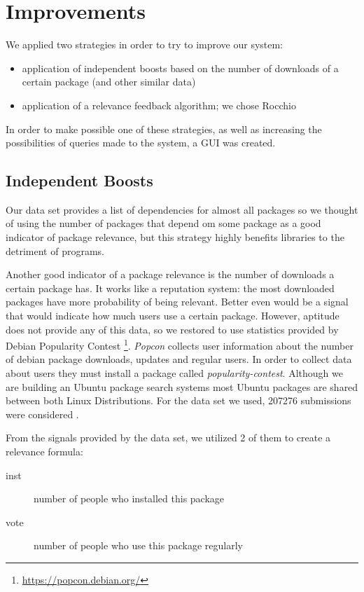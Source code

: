 \section{Improvements}

We applied two strategies in order to try to improve our system:

\begin{itemize}
    \item application of independent boosts based on the number of downloads of a certain package (and other similar data)
    \item application of a relevance feedback algorithm; we chose Rocchio
\end{itemize}

In order to make possible one of these strategies, as well as increasing the possibilities of queries made to the system, a GUI was created.

\subsection{Independent Boosts}

Our data set provides a list of dependencies for almost all packages so we thought of using the number of packages that depend om some package as a good indicator of package relevance, but this strategy highly benefits libraries to the detriment of programs.

Another good indicator of a package relevance is the number of downloads a certain package has. It works like a reputation system: the most downloaded packages have more probability of being relevant. Better even would be a signal that would indicate how much users use a certain package. However, aptitude does not provide any of this data, so we restored to use statistics provided by Debian Popularity Contest \footnote{\url{https://popcon.debian.org/}}. \emph{Popcon} collects user information about the number of debian package downloads, updates and regular users. In order to collect data about users they must install a package called \textit{popularity-contest}. Although we are building an Ubuntu package search systems most Ubuntu packages are shared between both Linux Distributions. For the data set we used, 207276 submissions were considered \cite{popcontest}.

From the signals provided by the data set, we utilized 2 of them to create a relevance formula:

\begin{description}
    \item[inst] number of people who installed this package
    \item[vote] number of people who use this package regularly
\end{description}

